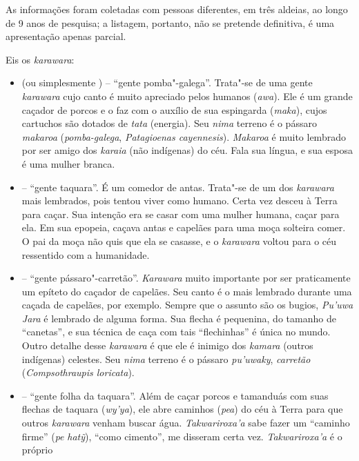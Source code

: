 As informações foram coletadas com pessoas diferentes, em três aldeias,
ao longo de 9 anos de pesquisa; a listagem, portanto, não se pretende
definitiva, é uma apresentação apenas parcial.

Eis os \emph{karawara}:

\begin{itemize}
\item
  \emph{} (ou simplesmente
  \emph{}) -- ``gente pomba"-galega''. Trata"-se de uma
  gente \emph{karawara} cujo canto é muito apreciado pelos humanos
  (\emph{awa}). Ele é um grande caçador de porcos e o faz com o auxílio
  de sua espingarda (\emph{maka}), cujos cartuchos são dotados de
  \emph{tata} (energia). Seu \emph{nima} terreno é o pássaro
  \emph{makaroa} (\emph{pomba-galega}, \emph{Patagioenas cayennesis}).
  \emph{Makaroa} é muito lembrado por ser amigo dos \emph{karaia} (não
  indígenas) do céu. Fala sua língua, e sua esposa é uma mulher branca.
\item
  \emph{} -- ``gente taquara''. É um comedor de antas.
  Trata"-se de um dos \emph{karawara} mais lembrados, pois tentou viver
  como humano. Certa vez desceu à Terra para caçar. Sua intenção era se
  casar com uma mulher humana, caçar para ela. Em sua epopeia, caçava
  antas e capelães para uma moça solteira comer. O pai da moça não quis
  que ela se casasse, e o \emph{karawara} voltou para o céu ressentido
  com a humanidade.
\item
  \emph{} -- ``gente pássaro"-carretão''.
  \emph{Karawara} muito importante por ser praticamente um epíteto do
  caçador de capelães. Seu canto é o mais lembrado durante uma caçada de
  capelães, por exemplo. Sempre que o assunto são os bugios,
  \emph{Pu'uwa Jara} é lembrado de alguma forma. Sua flecha é
  pequenina, do tamanho de ``canetas'', e sua técnica de caça com tais
  ``flechinhas'' é única no mundo. Outro detalhe desse \emph{karawara} é
  que ele é inimigo dos \emph{kamara} (outros indígenas) celestes. Seu
  \emph{nima} terreno é o pássaro \emph{pu'uwaky}, \emph{carretão}
  (\emph{Compsothraupis loricata}).
\item
  \emph{} -- ``gente folha da taquara''. Além de
  caçar porcos e tamanduás com suas flechas de taquara (\emph{wy'ya}),
  ele abre caminhos (\emph{pea}) do céu à Terra para que outros
  \emph{karawara} venham buscar água. \emph{\emph{Takwariroxa'a}} sabe
  fazer um ``caminho firme'' (\emph{pe} \emph{hatỹ}), ``como cimento'', me
  disseram certa vez. \emph{\emph{Takwariroxa'a}} é o próprio

\end{itemize}
